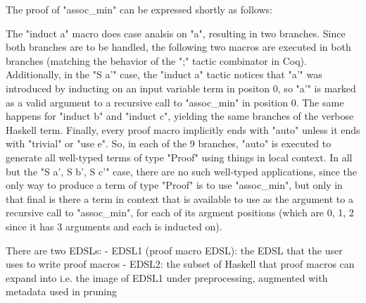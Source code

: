 % 
% 

  
 
  
  
 The proof of "assoc\_min" can be expressed shortly as follows:
  
 The "induct a" macro does case analsis on "a", resulting in two branches. Since both branches are to be handled, the following two macros are executed in both branches (matching the behavior of the ";" tactic combinator in Coq).
 Additionally, in the "S a'" case, the "induct a" tactic notices that "a'" was introduced by inducting on an input variable term in positon 0, so "a'" is marked as a valid argument to a recursive call to "assoc\_min" in position 0.
 The same happens for "induct b" and "induct c", yielding the same branches of the verbose Haskell term.
 Finally, every proof macro implicitly ends with "auto" unless it ends with "trivial" or "use e".
 So, in each of the 9 branches, "auto" is executed to generate all well-typed terms of type "Proof" using things in local context.
 In all but the "S a', S b', S c'" case, there are no such well-typed applications, since the only way to produce a term of type "Proof" is to use "assoc\_min", but only in that final is there a term in context that is available to use as the argument to a recursive call to "assoc\_min", for each of its argment positions (which are 0, 1, 2 since it has 3 arguments and each is inducted on).
  
  
 There are two EDSLs:
 - EDSL1 (proof macro EDSL): the EDSL that the user uses to write proof macros
 - EDSL2: the subset of Haskell that proof macros can expand into i.e. the image of EDSL1 under preprocessing, augmented with metadata used in pruning
  
